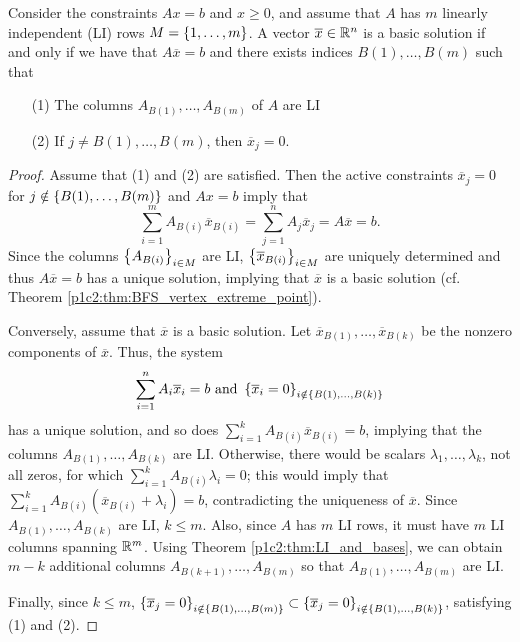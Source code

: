 \begin{theorem} \label{p1c3:thm:LI_and_bases}
	Consider the constraints $Ax = b$ and $x \geq 0$, and assume that $A$ has $m$ linearly independent (LI) rows $M = \left\{ 1,\dots,m \right \}$. A vector $\overline{x} \in \mathbb{R}^n$ is a basic solution if and only if we have that $A \overline{x} = b$ and there exists indices $B(1), \dots, B(m)$ such that
	\begin{enumerate}
		\item[(1)] The columns $A_{B(1)}, \dots, A_{B(m)}$ of $A$ are LI
		\item[(2)] If $j \neq B(1), \dots, B(m)$, then $\overline{x}_j = 0$.
	\end{enumerate} 
\end{theorem}

\begin{proof}
	Assume that (1) and (2) are satisfied. Then the active constraints $\overline{x}_j = 0$ for $j \notin \left\{ B(1), \dots, B(m) \right \}$ and $Ax = b$ imply that
%	
	\begin{equation*}
		\sum_{i=1}^m A_{B(i)}\overline{x}_{B(i)} = \sum_{j=1}^n A_j\overline{x}_j = A\overline{x} = b.
	\end{equation*}
%
	Since the columns $\left\{ A_{B(i)} \right \}_{i \in M}$ are LI, $\left\{ \overline{x}_{B(i)} \right \}_{i \in M}$ are uniquely determined and thus $A\overline{x} = b$ has a unique solution, implying that $\overline{x}$ is a basic solution (cf. Theorem \ref{p1c2:thm:BFS_vertex_extreme_point}).
	
	Conversely, assume that $\overline{x}$ is a basic solution. Let $\overline{x}_{B(1)}, \dots, \overline{x}_{B(k)}$ be the nonzero components of $\overline{x}$. Thus, the system 
%	
		\begin{equation*}
			\sum_{i=1}^n A_i\overline{x}_i = b \text{ and } \left\{ \overline{x}_i = 0 \right \}_{i \notin \left\{ B(1), \dots, B(k) \right \}}
		\end{equation*}
%
	has a unique solution, and so does $\sum_{i=1}^k A_{B(i)}\overline{x}_{B(i)} = b$, implying that the columns $A_{B(1)}, \dots, A_{B(k)}$ are LI. Otherwise, there would be scalars $\lambda_1,\dots, \lambda_k$, not all zeros, for which $\sum_{i=1}^k A_{B(i)}\lambda_i = 0$; this would imply that $\sum_{i=1}^k A_{B(i)}(\overline{x}_{B(i)} + \lambda_i) =b$, contradicting the uniqueness of $\overline{x}$.
	Since $A_{B(1)}, \dots, A_{B(k)}$ are LI, $k \leq m$. Also, since $A$ has $m$ LI rows, it must have $m$ LI columns spanning $\mathbb{R}^m$. Using Theorem \ref{p1c2:thm:LI_and_bases}, we can obtain $m-k$ additional columns $A_{B(k+1)}, \dots, A_{B(m)}$ so that $A_{B(1)}, \dots, A_{B(m)}$ are LI. 
	
	Finally, since $k \leq m $, $\left\{ \overline{x}_j = 0 \right \}_{i \notin \left\{ B(1), \dots, B(m) \right \}} \subset  \left\{ \overline{x}_j = 0 \right \}_{i \notin \left\{ B(1), \dots, B(k) \right \}}$, satisfying (1) and (2). \qedhere 		
\end{proof}	

